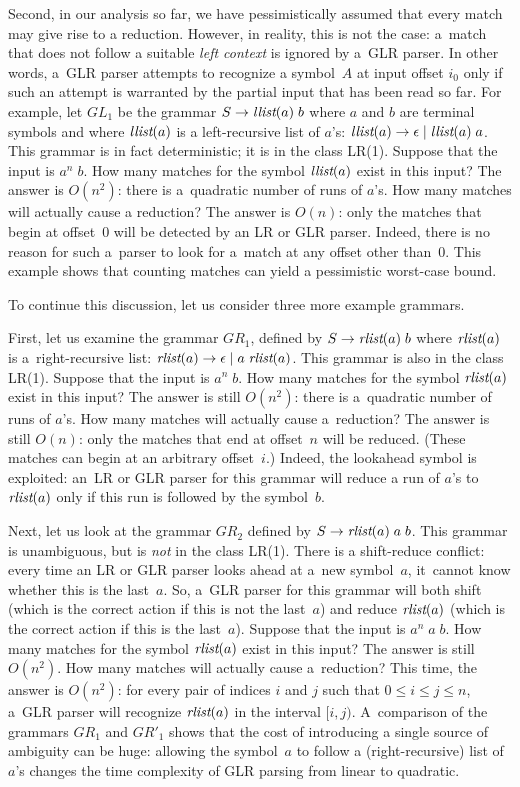 Second, in our analysis so far,
we have pessimistically assumed
that every match may give rise to a reduction.
However, in reality, this is not the case:
a~match that does not follow a suitable \emph{left context}
is ignored by a~GLR parser.
In other words, a~GLR parser attempts to recognize a symbol~$A$
at input offset $i_0$ only if such an attempt
is warranted by the partial input that has been read so far.
For example,
let $\mathit{GL}_1$ be
the grammar $S \rightarrow \textit{llist}(a) \; b$
where $a$ and $b$ are terminal symbols
and where $\textit{llist}(a)$ is a left-recursive list of $a$'s:
$\textit{llist}(a) \rightarrow \epsilon \mid \textit{llist}(a) \; a$.
This grammar is in fact deterministic; it is in the class LR(1).
Suppose that the input is $a^n \; b$.
How many matches for the symbol $\textit{llist}(a)$ exist in this input?
The answer is $O(n^2)$: there is a~quadratic number of runs of $a$'s.
How many matches will actually cause a reduction?
The answer is $O(n)$: only the matches that begin at offset~$0$
will be detected by an LR or GLR parser.
Indeed, there is no reason for such a~parser
to look for a~match at any offset other than~$0$.
%
This example shows that counting matches
can yield a pessimistic worst-case bound.

To continue this discussion,
let us consider three more example grammars.

First,
let us examine the grammar $\mathit{GR}_1$,
defined by $S \rightarrow \textit{rlist}(a) \; b$
where $\textit{rlist}(a)$ is a~right-recursive list:
$\textit{rlist}(a) \rightarrow \epsilon \mid a \; \textit{rlist}(a)$.
This grammar is also in the class LR(1).
Suppose that the input is $a^n \; b$.
How many matches for the symbol $\textit{rlist}(a)$ exist in this input?
The answer is still $O(n^2)$: there is a~quadratic number of runs of $a$'s.
How many matches will actually cause a~reduction?
The answer is still $O(n)$:
only the matches that end at offset~$n$
will be reduced. (These matches can begin at an arbitrary offset~$i$.)
Indeed, the lookahead symbol is exploited:
an~LR or GLR parser for this grammar will reduce a run of $a$'s
to $\textit{rlist}(a)$ only if this run is followed by the symbol~$b$.

Next,
let us look at the grammar $\mathit{GR}_2$
defined by $S \rightarrow \textit{rlist}(a) \; a \; b$.
%
This grammar is unambiguous,
but is \emph{not} in the class LR(1).
%
There is a shift-reduce conflict:
every time an LR or GLR parser looks ahead at a~new symbol~$a$,
it~cannot know whether this is the last~$a$.
So, a~GLR parser for this grammar will both shift
(which is the correct action if this is not the last~$a$)
and reduce $\textit{rlist}(a)$
(which is the correct action if this is the last~$a$).
%
Suppose that the input is $a^n \; a \; b$.
How many matches for the symbol $\textit{rlist}(a)$ exist in this input?
The answer is still $O(n^2)$.
How many matches will actually cause a~reduction?
This time, the answer is $O(n^2)$:
for every pair of indices $i$ and $j$
such that $0 \leq i \leq j \leq n$,
a~GLR parser will recognize $\textit{rlist}(a)$ in the interval $[i, j)$.
%
A~comparison of the grammars $\mathit{GR}_1$ and $\mathit{GR}'_1$ shows that
the cost of introducing a single source of ambiguity can be huge: allowing
the symbol~$a$ to follow a (right-recursive) list of $a$'s
changes the time complexity of GLR parsing from linear to quadratic.

